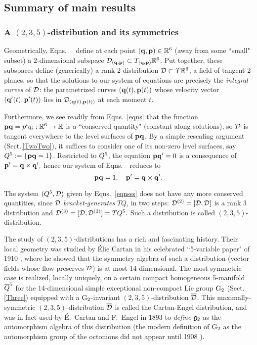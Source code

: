 \subsection{Summary of main results}


\subsubsection{A $(2,3,5)$-distribution  and its symmetries}\label{nonint}
Geometrically,  Eqns.~ \eqns\ define at each point  $(\mathbf q,{\mathbf p})\in\mathbb{R}^6$ (away from some ``small" subset)  a $2$-dimensional subspace ${\mathcal D}_{(\mathbf q,{\mathbf p})}\subset T_{(\mathbf q,{\mathbf p})}\mathbb{R}^6$. Put together, these subspaces define (generically) a rank 2 distribution  ${\mathcal D}\subset T\mathbb{R}^6$, a field of tangent 2-planes,  so that the solutions to our system of equations are precisely the {\em integral curves} of ${\mathcal D}$: the  parametrized curves $(\mathbf q(t), {\mathbf p}(t))$ whose velocity vector $(\mathbf q'(t), {\mathbf p}'(t))$   lies in  ${\mathcal D}_{(\mathbf q(t),{\mathbf p}(t))}$ at each moment $t$.
 
 Furthermore,  we see readily from  Eqns.~\eqref{eqns} that the function ${\mathbf p}\mathbf q=p^iq_i:\mathbb{R}^6\to\mathbb{R}$
  is a ``conserved quantity" (constant along solutions), so ${\mathcal D}$
   is  tangent everywhere to the level surfaces of ${\mathbf p}\mathbf q$. 
   By a simple rescaling argument (Sect.\,\ref{TwoTwo}),  
   it suffices to consider one of its non-zero  level surfaces,  
   say  $Q^5:=\{{\mathbf p}\mathbf q=1\}$.  Restricted to $Q^5$, the equation 
   ${\mathbf p}\mathbf q'=0$ is a consequence of ${\mathbf p}'=\mathbf q\times\mathbf q',$ 
   hence our system of Eqns.~\eqns\ reduces to  
\begin{equation}\label{eqnsss}
{\mathbf p}\mathbf q=1, \quad {\mathbf p}'=\mathbf q\times\mathbf q'.
\end{equation}


The system $(Q^5,{\mathcal D})$ given by Eqns.~\eqref{eqnsss} does not have any more conserved quantities, since  ${\mathcal D}$ {\em bracket-generates} $TQ$,  in two steps: ${\mathcal D}^{(2)}=[{\mathcal D},{\mathcal D}]$ is a rank 3 distribution and ${\mathcal D}^{(3)}=[{\mathcal D}, {\mathcal D}^{(2)}]=TQ^5.$ Such a distribution is called  $(2,3,5)$-distribution. 

The study of  $(2,3,5)$-distributions  has a rich and fascinating history. Their local geometry was studied by \'Elie Cartan in his   celebrated ``5-variable paper" of 1910 \cite{C_5var}, where  he showed that the symmetry algebra of such a distribution (vector fields  whose flow preserves ${\mathcal D}$) is at most 14-dimensional. The most symmetric case  is realized, locally  uniquely, on a certain compact homogeneous 5-manifold $\overline{Q}^5$ for the 14-dimensional simple exceptional non-compact Lie group ${\rm G}_2$ (Sect.\,\ref{Three}) equipped with a ${\rm G}_2$-invariant $(2,3,5)$-distribution $\overline{\mathcal D}$. This maximally-symmetric $(2,3,5)$-distribution $\overline{\mathcal D}$  is called the Cartan-Engel distribution, and was in fact  used  by \'E.~Cartan and F.~Engel  in 1893 \cite{C1, Eng} to  {\em define} ${\mathfrak{g}}_2$ as the automorphism algebra of this distribution (the modern definition of  ${\rm G}_2$ as the automorphism group of  the octonions did not appear until 1908 \cite{Ca3}). 

